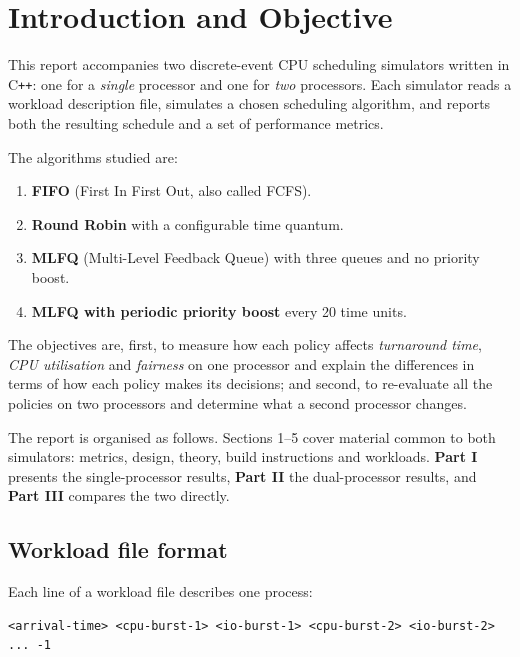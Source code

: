 \documentclass[11pt,a4paper]{article}
\begin{document}
\tableofcontents
\newpage

\section{Introduction and Objective}

This report accompanies two discrete-event CPU scheduling simulators written in
C\texttt{++}: one for a \emph{single} processor and one for \emph{two} processors. Each
simulator reads a workload description file, simulates a chosen scheduling algorithm, and
reports both the resulting schedule and a set of performance metrics.

The algorithms studied are:

\begin{enumerate}
  \item \textbf{FIFO} (First In First Out, also called FCFS).
  \item \textbf{Round Robin} with a configurable time quantum.
  \item \textbf{MLFQ} (Multi-Level Feedback Queue) with three queues and no priority boost.
  \item \textbf{MLFQ with periodic priority boost} every 20 time units.
\end{enumerate}

The objectives are, first, to measure how each policy affects \emph{turnaround time},
\emph{CPU utilisation} and \emph{fairness} on one processor and explain the differences in
terms of how each policy makes its decisions; and second, to re-evaluate all the policies
on two processors and determine what a second processor changes.

The report is organised as follows. Sections 1--5 cover material common to both
simulators: metrics, design, theory, build instructions and workloads.
\textbf{Part I} presents the single-processor results, \textbf{Part II} the
dual-processor results, and \textbf{Part III} compares the two directly.

\subsection{Workload file format}

Each line of a workload file describes one process:

\begin{lstlisting}
<arrival-time> <cpu-burst-1> <io-burst-1> <cpu-burst-2> <io-burst-2> ... -1
\end{lstlisting}
\end{document}
